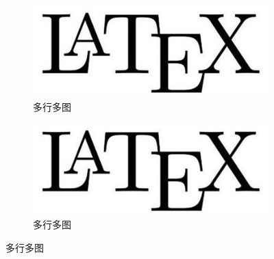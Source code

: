 \begin{figure}[htbp]
    \centering
    \begin{subfigure}[t]{0.4\linewidth}
        \includegraphics[width=\linewidth]{figure/Latex.jpg}
        \caption{多行多图}
        \label{fig:myfig7}
    \end{subfigure}
    \quad
    \begin{subfigure}[t]{0.4\linewidth}
        \includegraphics[width=\linewidth]{figure/Latex.jpg}
        \caption{多行多图}
        \label{fig:myfig8}
    \end{subfigure}
    \quad
    

\end{figure}
